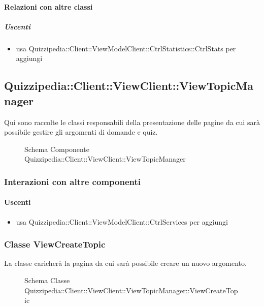 \paragraph{Relazioni con altre classi}
\subparagraph{Uscenti}
\begin{itemize}
\item usa Quizzipedia::Client::ViewModelClient::CtrlStatistics::CtrlStats per aggiungi
\end{itemize}
\subsection{Quizzipedia::Client::ViewClient::ViewTopicManager}
Qui sono raccolte le classi responsabili della presentazione delle pagine da cui sarà possibile gestire gli argomenti di domande e quiz.
\begin{figure}[H]
\centering
\noindent{}
\caption[Schema Componente Quizzipedia::Client::ViewClient::ViewTopicManager]{Schema Componente Quizzipedia::Client::ViewClient::ViewTopicManager}
\end{figure}
\subsubsection{Interazioni con altre componenti}
\paragraph{Uscenti}
\begin{itemize}
\item usa Quizzipedia::Client::ViewModelClient::CtrlServices per aggiungi
\end{itemize}
\subsubsection{Classe ViewCreateTopic}
La classe caricherà la pagina da cui sarà possibile creare un nuovo argomento.
\begin{figure}[H]
\centering
\noindent{}
\caption[Schema Classe ViewCreateTopic]{Schema Classe Quizzipedia::Client::ViewClient::ViewTopicManager::ViewCreateTopic}
\end{figure}
